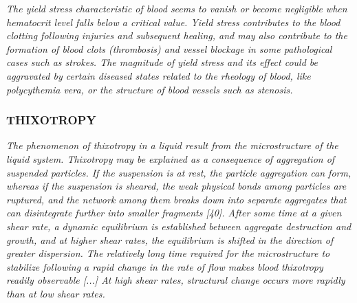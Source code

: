 \documentclass[11pt,letterpaper]{article}
\begin{document}
\textit{The yield stress characteristic of blood seems to vanish or become negligible when hematocrit level falls below a critical value. Yield stress contributes to the blood clotting following injuries and subsequent healing, and may also contribute to the formation of blood clots (thrombosis) and vessel blockage in some pathological cases such as strokes. The magnitude of yield stress and its effect could be aggravated by certain diseased states related to the rheology of blood, like polycythemia vera, or the structure of blood vessels such as stenosis.}

\subsubsection*{THIXOTROPY }\textit{The phenomenon of thixotropy in a liquid result from the microstructure of the liquid
system. Thixotropy may be explained as a consequence of aggregation of suspended particles. If the suspension is at rest, the particle aggregation can form, whereas if the suspension is sheared, the weak physical bonds among particles are ruptured, and the network among them breaks down into separate aggregates that can disintegrate further into smaller fragments [40]. After some time at a given shear rate, a dynamic equilibrium is established between aggregate destruction and growth, and at higher shear rates, the equilibrium is shifted in the direction of greater dispersion. The relatively long time required for the microstructure to stabilize following a rapid change in the rate of flow makes blood thixotropy readily observable [...] At high shear rates, structural change occurs more rapidly than at low shear rates.}
\end{document}

